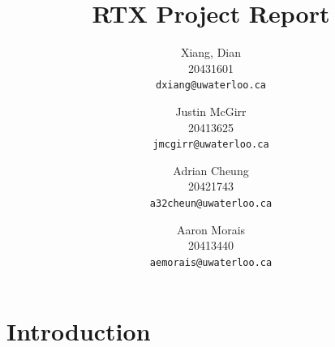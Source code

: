 \documentclass[12pt,twocolumn]{report}
\begin{document}

\title{RTX Project Report}

\author{
    Xiang, Dian\\
    20431601\\
    \texttt{dxiang@uwaterloo.ca}
    \and
    Justin McGirr\\
    20413625\\
    \texttt{jmcgirr@uwaterloo.ca}
    \and
    Adrian Cheung\\
    20421743\\
    \texttt{a32cheun@uwaterloo.ca}
    \and
    Aaron Morais\\
    20413440\\
    \texttt{aemorais@uwaterloo.ca}
}

\maketitle

\begin{abstract}
\end{abstract}

\tableofcontents
\listofalgorithms
\listoffigures



\part{Introduction}
\end{document}
